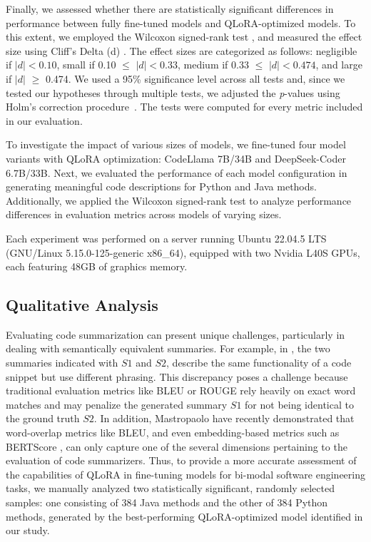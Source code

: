 Finally, we assessed whether there are statistically significant differences in performance between fully fine-tuned models and QLoRA-optimized models. To this extent, we employed the Wilcoxon signed-rank test \cite{wilcoxon}, and measured the effect size using Cliff’s Delta (d) \cite{Cliff:2005}. The effect sizes are categorized as follows: negligible if $|d| < 0.10$, small if 0.10 $\leq$ $|d| < 0.33$, medium if 0.33 $\leq$ $|d| < 0.474$, and large if $|d|$ $\geq$ 0.474. We used a 95\% significance level across all tests and, since we tested our hypotheses through multiple tests, we adjusted the \emph{p}-values using Holm’s correction procedure~\cite{Holm1979a}.
The tests were computed for every metric included in our evaluation.


To investigate the impact of various sizes of models, we fine-tuned four model variants with QLoRA optimization: CodeLlama 7B/34B and DeepSeek-Coder 6.7B/33B. Next, we evaluated the performance of each model configuration in generating meaningful code descriptions for Python and Java methods. Additionally, we applied the Wilcoxon signed-rank test to analyze performance differences in evaluation metrics across models of varying sizes.

Each experiment was performed on a server running Ubuntu 22.04.5 LTS (GNU/Linux 5.15.0-125-generic x86\_64), equipped with two Nvidia L40S GPUs, each featuring 48GB of graphics memory.


\subsection{Qualitative Analysis}
\label{sec:qualitative}

Evaluating code summarization can present unique challenges, particularly in dealing with semantically equivalent summaries. For example, in , the two summaries indicated with $S1$ and $S2$, describe the same functionality of a code snippet but use different phrasing. This discrepancy poses a challenge because traditional evaluation metrics like BLEU or ROUGE rely heavily on exact word matches and may penalize the generated summary $S1$ for not being identical to the ground truth $S2$. In addition, Mastropaolo \etal \cite{mastropaolo2024evaluating} have recently demonstrated that word-overlap metrics like BLEU, and even embedding-based metrics such as BERTScore \cite{zhang2019bertscore}, can only capture one of the several dimensions pertaining to the evaluation of code summarizers.
Thus, to provide a more accurate assessment of the capabilities of QLoRA in fine-tuning models for bi-modal software engineering tasks, we manually analyzed two statistically significant, randomly selected samples: one consisting of 384 Java methods and the other of 384 Python methods, generated by the best-performing QLoRA-optimized model identified in our study.


